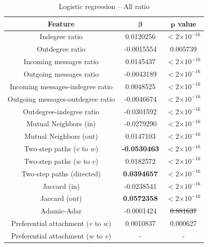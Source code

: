 \documentclass[conference]{IEEEtran}
\providecommand{\e}[1]{\ensuremath{\times 10^{#1}}}
\begin{document}
\begin{table}[!t]
\renewcommand{\arraystretch}{1.3}
\caption{Logistic regression -- All ratio}
\label{table_recresults_lograll2}
\centering
\begin{tabular}{|c||c|c|}
\hline
\bf{Feature} & $\mathbf{\beta}$ & $\mathbf{p}$ value \\
\hline
Indegree ratio     &    0.0120256  & $< 2 \e{-16} $\\
Outdegree ratio    &   -0.0015554  & 0.005739 \\
Incoming messages ratio    &    0.0145437  & $< 2 \e{-16} $\\
Outgoing messages ratio   &   -0.0043189  & $< 2 \e{-16} $\\
Incoming messages-indegree ratio   & 0.0048525   & $< 2 \e{-16} $ \\
Outgoing messages-outdegree ratio   & -0.0046674 & $< 2 \e{-16} $ \\
Outdegree-indegree ratio  &  -0.0301592  & $< 2 \e{-16} $\\
\hline
Mutual Neighbors (in) & -0.0279290  &$< 2 \e{-16} $\\
Mutual Neighbors (out) & 0.0147103  & $< 2 \e{-16} $\\
Two-step paths ($v$ to $w$)  &  \bf{-0.0530463}   & $< 2 \e{-16} $\\
Two-step paths ($w$ to $v$)   &    0.0182572   & $< 2 \e{-16} $\\
\hline
Two-step paths (directed)  &   \bf{0.0394657} & $< 2 \e{-16} $\\
Jaccard (in) & -0.0238541 & $< 2 \e{-16} $\\
Jaccard (out) &   \bf{0.0572358}  & $< 2 \e{-16} $\\
Adamic-Adar  &    -0.0001424 & \sout{0.881637} \\
Preferential attachment ($v$ to $w$) & 0.0010837  & 0.000627 \\
Preferential attachment ($w$ to $v$)  &  - & -  \\
\hline
\end{tabular}
\end{table}
\end{document}
